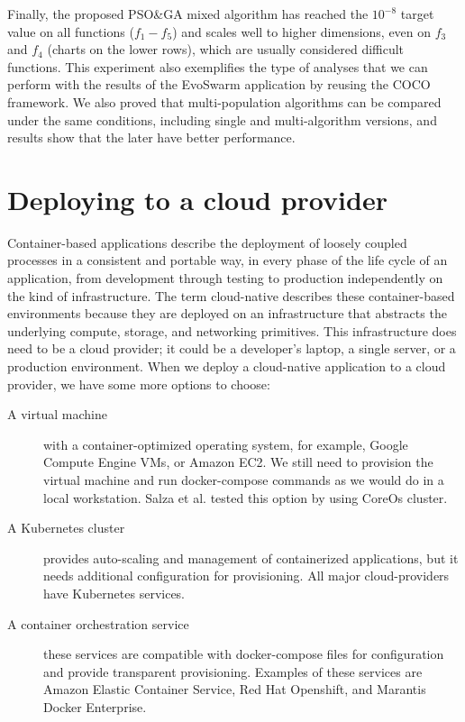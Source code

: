 \documentclass[review]{elsarticle}
\begin{document}
Finally, the proposed PSO\&GA mixed algorithm has reached the $10^{-8}$ target
value on all functions ($f_1-f_5$) and scales well to higher dimensions, even on
$f_3$ and $f_4$ (charts on the lower rows), which are usually considered
difficult functions. This experiment also exemplifies the type of analyses that
we can perform with the results of the EvoSwarm application by reusing the COCO framework.
We also proved that multi-population algorithms can be compared under the same 
conditions, including single and multi-algorithm versions, and results show 
that the later have better performance.


\section{Deploying to a cloud provider}
\label{cloud-aws}
Container-based applications describe the deployment of loosely coupled
processes in a consistent and portable way, in every phase of the life cycle of
an application, from development through testing to production independently on
the kind of infrastructure. The term cloud-native describes these
container-based environments because they are deployed on an infrastructure that
abstracts the underlying compute, storage, and networking primitives. This
infrastructure does need to be a cloud provider; it could be a developer's
laptop, a single server, or a production environment. When we deploy a
cloud-native application to a cloud provider, we have some more options to
choose:

\begin{description}
  
  \item[A virtual machine] with a container-optimized operating system, for example,
  Google Compute Engine VMs, or Amazon EC2.  We still need to provision the
  virtual machine and run docker-compose commands as we would do in a local 
  workstation. Salza et al. \cite{salza2019speed} tested this option by using
  CoreOs cluster. 

  \item[A Kubernetes cluster] provides auto-scaling and management of containerized
  applications, but it needs additional configuration for provisioning. All major
  cloud-providers have Kubernetes services.

  \item[A container orchestration service] these services are compatible with docker-compose
    files for configuration and provide transparent provisioning. Examples of these
    services are Amazon Elastic Container Service,  Red Hat Openshift, and Marantis Docker Enterprise.

\end{description}
    
\end{document}

